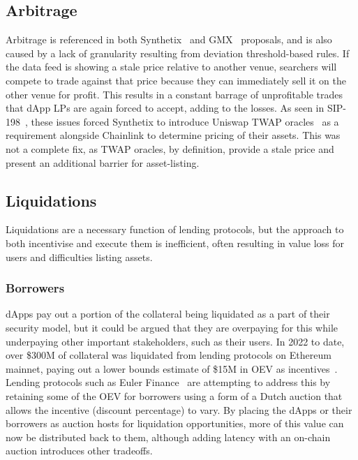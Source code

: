 \documentclass[11pt]{article}
\begin{document}
\subsection{Arbitrage}

Arbitrage is referenced in both Synthetix~\cite{sip-198} and GMX~\cite{kip-17} proposals, and is also caused by a lack of granularity resulting from deviation threshold-based rules.
If the data feed is showing a stale price relative to another venue, searchers will compete to trade against that price because they can immediately sell it on the other venue for profit.
This results in a constant barrage of unprofitable trades that dApp LPs are again forced to accept, adding to the losses.
As seen in SIP-198~\cite{sip-198}, these issues forced Synthetix to introduce Uniswap TWAP oracles~\cite{uniswap} as a requirement alongside Chainlink to determine pricing of their assets.
This was not a complete fix, as TWAP oracles, by definition, provide a stale price and present an additional barrier for asset-listing.

\subsection{Liquidations}

Liquidations are a necessary function of lending protocols, but the approach to both incentivise and execute them is inefficient, often resulting in value loss for users and difficulties listing assets.

\subsubsection{Borrowers}

dApps pay out a portion of the collateral being liquidated as a part of their security model, but it could be argued that they are overpaying for this while underpaying other important stakeholders, such as their users.
In 2022 to date, over \$300M of collateral was liquidated from lending protocols on Ethereum mainnet, paying out a lower bounds estimate of \$15M in OEV as incentives~\cite{dune-liquidations}.
Lending protocols such as Euler Finance~\cite{euler} are attempting to address this by retaining some of the OEV for borrowers using a form of a Dutch auction that allows the incentive (discount percentage) to vary.
By placing the dApps or their borrowers as auction hosts for liquidation opportunities, more of this value can now be distributed back to them, although adding latency with an on-chain auction introduces other tradeoffs.
\end{document}
